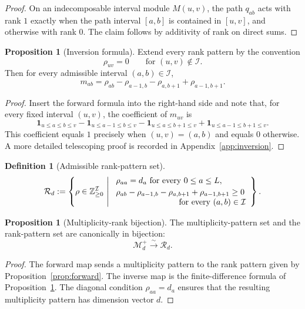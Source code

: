 \documentclass[11pt]{article}
\newcommand{\Z}{\mathbb{Z}}
\theoremstyle{definition}
\newtheorem{proposition}[theorem]{Proposition}
\newtheorem{definition}[theorem]{Definition}
\begin{document}
\begin{proof}
On an indecomposable interval module \(M(u,v)\), the path \(q_{ab}\) acts with
rank \(1\) exactly when the path interval \([a,b]\) is contained in \([u,v]\),
and otherwise with rank \(0\). The claim follows by additivity of rank on
direct sums.
\end{proof}

\begin{proposition}[Inversion formula]
\label{prop:inversion}
Extend every rank pattern by the convention
\[
\rho_{uv}=0
\qquad
\text{for }(u,v)\notin \mathcal I.
\]
Then for every admissible interval \((a,b)\in \mathcal I\),
\[
m_{ab}
=
\rho_{ab}-\rho_{a-1,b}-\rho_{a,b+1}+\rho_{a-1,b+1}.
\]
\end{proposition}

\begin{proof}
Insert the forward formula into the right-hand side and note that, for every
fixed interval \((u,v)\), the coefficient of \(m_{uv}\) is
\[
\mathbf 1_{u\leq a\leq b\leq v}
-\mathbf 1_{u\leq a-1\leq b\leq v}
-\mathbf 1_{u\leq a\leq b+1\leq v}
+\mathbf 1_{u\leq a-1\leq b+1\leq v}.
\]
This coefficient equals \(1\) precisely when \((u,v)=(a,b)\) and equals \(0\)
otherwise. A more detailed telescoping proof is recorded in
Appendix~\ref{app:inversion}.
\end{proof}

\begin{definition}[Admissible rank-pattern set]
\[
\mathcal R_d
:=
\left\{
\rho\in \Z_{\geq 0}^{\mathcal I}
\ \middle|\
\begin{array}{l}
\rho_{aa}=d_a \text{ for every }0\leq a\leq L,\\[2pt]
\rho_{ab}-\rho_{a-1,b}-\rho_{a,b+1}+\rho_{a-1,b+1}\geq 0\\
\hspace{2.7cm}\text{for every }(a,b)\in \mathcal I
\end{array}
\right\}.
\]
\end{definition}

\begin{proposition}[Multiplicity-rank bijection]
\label{thm:rank-bijection}
The multiplicity-pattern set and the rank-pattern set are canonically in
bijection:
\[
\mathcal M_d^+
\xrightarrow{\sim}
\mathcal R_d.
\]
\end{proposition}

\begin{proof}
The forward map sends a multiplicity pattern to the rank pattern given by
Proposition~\ref{prop:forward}. The inverse map is the finite-difference formula
of Proposition~\ref{prop:inversion}. The diagonal condition \(\rho_{aa}=d_a\)
ensures that the resulting multiplicity pattern has dimension vector \(d\).
\end{proof}
\end{document}
